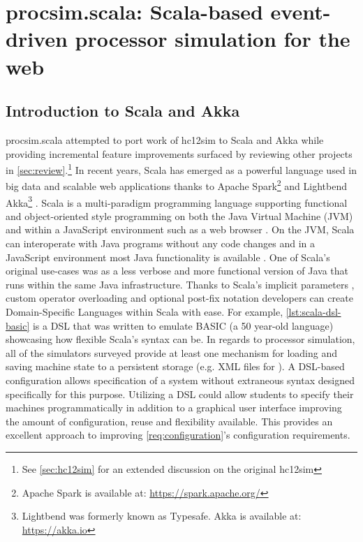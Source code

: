 \chapter{procsim.scala: Scala-based event-driven processor simulation for the web}
\label{ch:scala-akka}

\newcommand{\scalainline}[1]{\texttt{#1}}
\newcommand{\akkaActor}{\scalainline{Actor}}

\section{Introduction to Scala and Akka}

procsim.scala attempted to port work of hc12sim to Scala and Akka while providing incremental feature improvements surfaced by reviewing other projects in \cref{sec:review}.\footnote{See \cref{sec:hc12sim} for an extended discussion on the original hc12sim} In recent years, Scala has emerged as a powerful language used in big data and scalable web applications thanks to Apache Spark\footnote{Apache Spark is available at: \url{https://spark.apache.org/}} and Lightbend Akka\footnote{Lightbend was formerly known as Typesafe. Akka is available at: \url{https://akka.io}} \cite{Karau2015, Alexandrov2014, Singh2015}. Scala is a multi-paradigm programming language supporting functional and object-oriented style programming on both the Java Virtual Machine (JVM) and within a JavaScript environment such as a web browser \cite{Scala-Lang}. On the JVM, Scala can interoperate with Java programs without any code changes and in a JavaScript environment most Java functionality is available \cite{Scala-js2015,Doeraene2017}. One of Scala's original use-cases was as a less verbose and more functional version of Java that runs within the same Java infrastructure. Thanks to Scala's implicit parameters \cite{Scala-ImplicitParameters}, custom operator overloading \cite{Scala-Operators} and optional post-fix notation \cite{Scala-MethodInvocations} developers can create Domain-Specific Languages within Scala with ease. For example, \cref{lst:scala-dsl-basic} is a DSL that was written to emulate BASIC (a 50 year-old language) showcasing how flexible Scala's syntax can be. In regards to processor simulation, all of the simulators surveyed provide at least one mechanism for loading and saving machine state to a persistent storage (e.g. XML files for \cite{Skrien2001, Black2013}). A DSL-based configuration allows specification of a system without extraneous syntax designed specifically for this purpose. Utilizing a DSL could allow students to specify their machines programmatically in addition to a graphical user interface improving the amount of configuration, reuse and flexibility available. This provides an excellent approach to improving \cref{req:configuration}'s configuration requirements.


